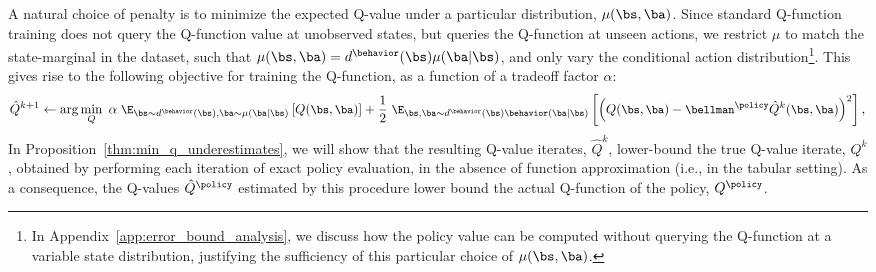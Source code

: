 A natural choice of penalty is to minimize the expected Q-value under a particular distribution, $\mu(\bs, \ba)$. Since standard Q-function training does not query the Q-function value at unobserved states, but queries the Q-function at unseen actions, 
we restrict $\mu$ to match the state-marginal in the dataset,
such that $\mu(\bs, \ba) = d^\behavior(\bs) \mu(\ba|\bs)$, and only vary the conditional action distribution\footnote{In Appendix~\ref{app:error_bound_analysis}, we discuss how the policy value can be computed without querying the Q-function at a variable state distribution, justifying the sufficiency of this particular choice of $\mu(\bs, \ba)$.}.
This gives rise to the following objective for training the Q-function, as a function of a tradeoff factor $\alpha$:
\begin{equation}
    \small{\hat{Q}^{k+1} \leftarrow \arg\min_{Q}~ \alpha~ \E_{\bs \sim d^\behavior(\bs), \ba \sim \mu(\ba|\bs)}\left[Q(\bs, \ba)\right] + \frac{1}{2}~ \E_{\bs, \ba \sim d^\behavior(\bs) \behavior(\ba|\bs)}\left[\left(Q(\bs, \ba) - \bellman^\policy \hat{Q}^{k} (\bs, \ba) \right)^2 \right],} 
    \label{eqn:objective_1}
\end{equation}
In Proposition~\ref{thm:min_q_underestimates}, we will show that the resulting Q-value iterates, $\hat{Q}^k$, lower-bound the true Q-value iterate, $Q^k$, obtained by performing each iteration of exact policy evaluation, in the absence of function approximation (i.e., in the tabular setting).
As a consequence, the Q-values $\hat{Q}^\policy$ estimated by this procedure lower bound the actual Q-function of the policy, $Q^\policy$. 

